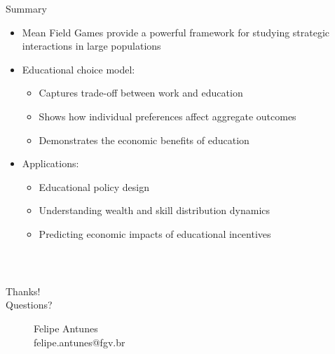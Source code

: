 \documentclass[xcolor=dvipsnames,t,aspectratio=170]{beamer} %
\newcommand{\highlight}[1]{{\color{fgv_light_blue} #1}}
\begin{document}
\begin{frame}{Summary}
\begin{itemize}
    \item Mean Field Games provide a powerful framework for studying strategic interactions in large populations
    \item Educational choice model:
    \begin{itemize}
        \item Captures trade-off between work and education
        \item Shows how individual preferences affect aggregate outcomes
        \item Demonstrates the economic benefits of education
    \end{itemize}
    \item Applications:
    \begin{itemize}
        \item Educational policy design
        \item Understanding wealth and skill distribution dynamics
        \item Predicting economic impacts of educational incentives
    \end{itemize}
\end{itemize}
\end{frame}

\begin{frame}
    \frametitle{~}
        \vfill
        \begin{center}
            {\Huge Thanks!}\vspace{1.5em}\\
            {\Large \highlight{Questions?}}\\
        \end{center}
        \vfill
        
        \begin{figure}[!b]
            \begin{flushright}
                \small Felipe Antunes\\ \highlight{felipe.antunes@fgv.br}
            \end{flushright}
        \end{figure} 
\end{frame}
\end{document}
